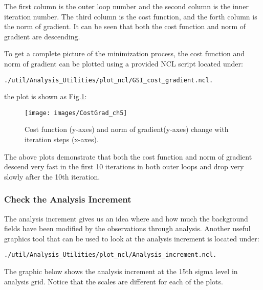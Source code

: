 The first column is the outer loop number and the second column is the inner iteration number.  The third column is the cost function, and the forth column is the norm of gradient.  It can be seen that both the cost function and norm of gradient are descending.

To get a complete picture of the minimization process, the cost function and norm of gradient can be plotted using a provided NCL script located under: 

\begin{scriptsize}
\begin{verbatim}
./util/Analysis_Utilities/plot_ncl/GSI_cost_gradient.ncl.
\end{verbatim}
\end{scriptsize}

the plot is shown as Fig.\ref{fig:costgrad_ch5}:

\begin{figure}[h!]
  \centering
  \texttt{[image: images/CostGrad\_ch5]}
  \caption{Cost function (y-axes) and norm of gradient(y-axes)  change with iteration steps (x-axes).}
  \label{fig:costgrad_ch5}
\end{figure}

The above plots demonstrate that both the cost function and norm of gradient descend very fast in the first 10 iterations in both outer loops and drop very slowly after the 10th iteration.

\subsubsection{Check the Analysis Increment}
\label{sec5.1.4.3}

The analysis increment gives us an idea where and how much the background fields have been modified by the observations through analysis.  Another useful graphics tool that can be used to look at the analysis increment is located under: 

\begin{scriptsize}
\begin{verbatim}
./util/Analysis_Utilities/plot_ncl/Analysis_increment.ncl.
\end{verbatim}
\end{scriptsize}  

The graphic below shows the analysis increment at the 15th sigma level in analysis grid. Notice that the scales are different for each of the plots. 

